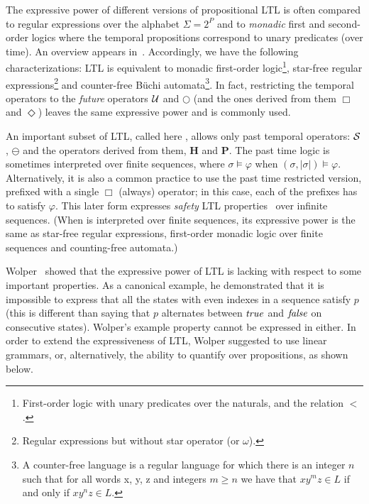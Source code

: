 The expressive power of different versions of propositional LTL is often compared to regular expressions
over the alphabet $\Sigma = 2^P$ and to  {\em monadic} first and second-order logics where the temporal propositions
correspond to unary predicates (over time). An overview appears in~\cite{Thomas}. Accordingly, we have the following characterizations:
LTL is equivalent to monadic first-order logic\footnote{First-order logic with unary predicates over the naturals, and the relation $<$.},  star-free regular expressions\footnote{Regular expressions but without star operator (or $\omega$).} and counter-free B\"{u}chi automata\footnote{A counter-free language is a regular language for which there is an integer $n$ such that for all words x, y, z and integers $m \geq n$ we have that $xy^m z \in L$ if and only if $xy^n z \in L$.}. In fact, restricting the temporal operators to the {\em future}  operators $\mathbin{\mathcal{U}}$ and $\bigcirc$
(and the ones derived from them $\Box$ and $\Diamond$)
leaves the same expressive power and is commonly used. 


An important subset of LTL, called here \PLTL{}, allows only past temporal
operators: ${\cal S}$, $\ominus$ and the operators derived
from them, $\mathbf{H}$ and $\mathbf{P}$. The past time logic is sometimes interpreted over finite sequences, 
where $\sigma \models \varphi$ when $( \sigma , | \sigma | ) \models \varphi$.
Alternatively,
it is also a common practice to use the past time restricted version, prefixed with  a single $\Box$ (always) operator; in this case, each of the prefixes has to satisfy $\varphi$. This later
form expresses {\em safety} LTL properties~\cite{AS} over infinite sequences. 
(When \PLTL{} is interpreted over finite sequences, its
expressive power is the same as star-free regular expressions, first-order monadic logic over finite sequences and counting-free automata.)


\label{sec:extending-prop-ltl}



Wolper~\cite{Wolper} showed that the expressive power of LTL is lacking with respect
to some important properties. As a canonical example, he demonstrated that it is impossible to
express that all the states with even indexes in a sequence
satisfy $p$ (this is
different than saying that $p$ alternates between $\mathit{true}$ and $\mathit{false}$ on consecutive states).
Wolper's example property cannot be expressed in \PLTL{} either.
In order to extend the expressiveness of LTL, Wolper suggested to use linear grammars, or, alternatively, the ability to quantify over
propositions, as shown below.

